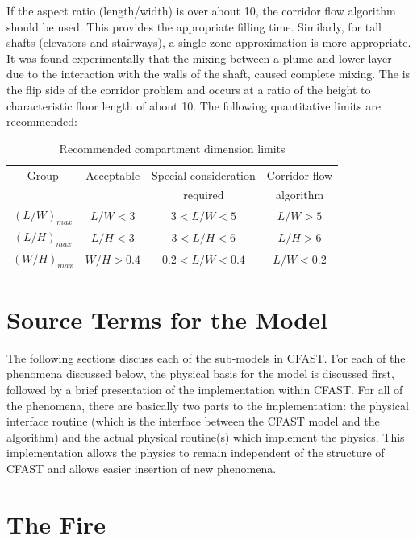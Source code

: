 If the aspect ratio (length/width) is over about 10, the corridor flow algorithm should be used.
This provides the appropriate filling time. Similarly, for tall shafts (elevators and stairways), a
single zone approximation is more appropriate. It was found experimentally \cite{Klote:1990} that the mixing
between a plume and lower layer due to the interaction with the walls of the shaft, caused
complete mixing. The is the flip side of the corridor problem and occurs at a ratio of the height
to characteristic floor length of about 10. The following quantitative limits are recommended:

\begin{table}[h]
\begin{center}
\caption{Recommended compartment dimension limits}
\label{tab:compartment_limits}
\vspace{0.1in}
\begin{tabular}{|c|c|c|c|}
\hline
Group & Acceptable & Special consideration & Corridor flow \\
 & & required & algorithm \\ \hline
$(L/W)_{max}$ & $L/W < 3$ & $3 < L/W < 5$ & $L/W > 5$ \\ \hline
$(L/H)_{max}$ &  $L/H < 3$ & $3 < L/H < 6$ & $L/H > 6$ \\ \hline
 $(W/H)_{max}$ & $W/H > 0.4$ & $0.2 < L/W < 0.4$ & $L/W < 0.2$ \\ \hline
\end{tabular}
\end{center}
\end{table}

\section{Source Terms for the Model}

The following sections discuss each of the sub-models in CFAST. For each of the phenomena discussed below, the
physical basis for the model is discussed first, followed by a brief presentation of the
implementation within CFAST. For all of the phenomena, there are basically two parts to the
implementation: the physical interface routine (which is the interface between the CFAST
model and the algorithm) and the actual physical routine(s) which implement the physics. This
implementation allows the physics to remain independent of the structure of CFAST and allows
easier insertion of new phenomena.

\section{The Fire}\label{sec:TheFire}

